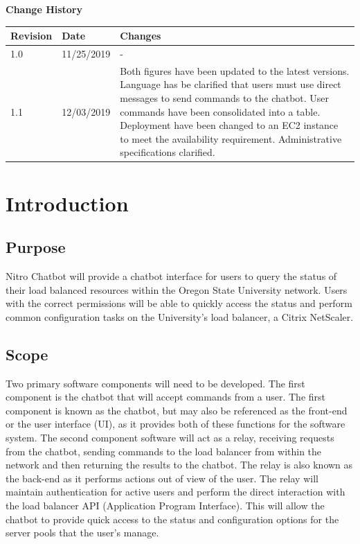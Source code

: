 \documentclass[onecolumn, draftclsnofoot,10pt, compsoc]{IEEEtran}
\begin{document}
\newpage
{}
\tableofcontents
\listoffigures
\listoftables
\clearpage
\textbf{Change History}\par

\begin{tabular}{ p{1in} p{1in} p{4in} }
 \textbf{Revision} & \textbf{Date} & \textbf{Changes} \\
 \hline
 1.0 & 11/25/2019 
 & - \\
 \hline
 1.1 & 12/03/2019 
 & Both figures have been updated to the latest versions. Language has be clarified that users must use direct messages to send commands to the chatbot. User commands have been consolidated into a table. Deployment have been changed to an EC2 instance to meet the availability requirement. Administrative specifications clarified. \\
 \hline
\end{tabular}

\clearpage

\section{Introduction}

\subsection{Purpose}
Nitro Chatbot will provide a chatbot interface for users to query the status of their load balanced resources within the Oregon State University network.
Users with the correct permissions will be able to quickly access the status and perform common configuration tasks on the University's load balancer, a Citrix NetScaler.

\subsection{Scope}
Two primary software components will need to be developed.
The first component is the chatbot that will accept commands from a user.
The first component is known as the chatbot, but may also be referenced as the front-end or the user interface (UI), as it provides both of these functions for the software system.
The second component software will act as a relay, receiving requests from the chatbot, sending commands to the load balancer from within the network and then returning the results to the chatbot.
The relay is also known as the back-end as it performs actions out of view of the user.
The relay will maintain authentication for active users and perform the direct interaction with the load balancer API (Application Program Interface).
This will allow the chatbot to provide quick access to the status and configuration options for the server pools that the user's manage.
\end{document}

